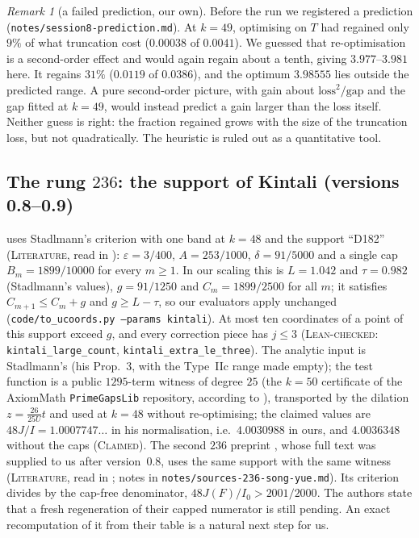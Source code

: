 \documentclass[11pt]{amsart}
\theoremstyle{definition}
\theoremstyle{remark}
\newtheorem{remark}[theorem]{Remark}
\newcommand{\lbl}[1]{\textup{\textsc{#1}}}
\begin{document}
\begin{remark}[a failed prediction, our own]\label{rem:prediction}
Before the run we registered a prediction
(\texttt{notes/}\allowbreak\texttt{session8-prediction.md}). At $k=49$, optimising on $T$ had
regained only $9\%$ of what truncation cost ($0.00038$ of $0.0041$). We
guessed that re-optimisation is a second-order effect and would again regain
about a tenth, giving $3.977$--$3.981$ here. It regains $31\%$ ($0.0119$ of
$0.0386$), and the optimum $3.98555$ lies outside the predicted range. A
pure second-order picture, with gain about $\mathrm{loss}^2/\mathrm{gap}$ and
the gap fitted at $k=49$, would instead predict a gain larger than the loss
itself. Neither guess is right: the fraction regained grows with the size of
the truncation loss, but not quadratically. The heuristic is ruled out as a
quantitative tool.
\end{remark}

\subsection*{The rung \texorpdfstring{$236$}{236}: the support of Kintali (versions 0.8--0.9)}
\cite{Kin26} uses Stadlmann's criterion with one band at $k=48$ and the
support ``D182'' (\lbl{Literature}, read in \cite[\S2]{Kin26}):
$\varepsilon=3/400$, $A=253/1000$, $\delta=91/5000$ and a single cap
$B_m=1899/10000$ for every $m\ge1$. In our scaling this is $L=1.042$ and
$\tau=0.982$ (Stadlmann's values), $g=91/1250$ and $C_m=1899/2500$ for all
$m$; it satisfies $C_{m+1}\le C_m+g$ and $g\ge L-\tau$, so our evaluators
apply unchanged (\texttt{code/to\_ucoords.py --params kintali}). At most ten
coordinates of a point of this support exceed $g$, and every correction piece
has $j\le3$ (\lbl{Lean-checked}: \texttt{kintali\_large\_count},
\texttt{kintali\_extra\_le\_three}). The analytic input is Stadlmann's
(his Prop.~3, with the Type~IIc range made empty); the test function is a public
$1295$-term witness of degree $25$ (the $k=50$ certificate of the AxiomMath
\texttt{PrimeGapsLib} repository, according to \cite[\S3]{Kin26}), transported
by the dilation $z=\frac{26}{25U}t$ and used at $k=48$ without re-optimising; the claimed values are
$48J/I=1.0007747\ldots$ in his normalisation, i.e.\ $4.0030988$ in ours,
and $4.0036348$ without the caps (\lbl{Claimed}). The second $236$
preprint \cite{SY26}, whose full text was supplied to us after version~0.8,
uses the same support with the same witness (\lbl{Literature}, read in
\cite[\S4]{SY26}; notes in \texttt{notes/}\allowbreak\texttt{sources-236-song-yue.md}).
Its criterion divides by the cap-free denominator, $48J(F)/I_0>2001/2000$.
The authors state that a fresh regeneration of their capped numerator is
still pending. An exact recomputation of it from their table is a natural
next step for us.
\end{document}
